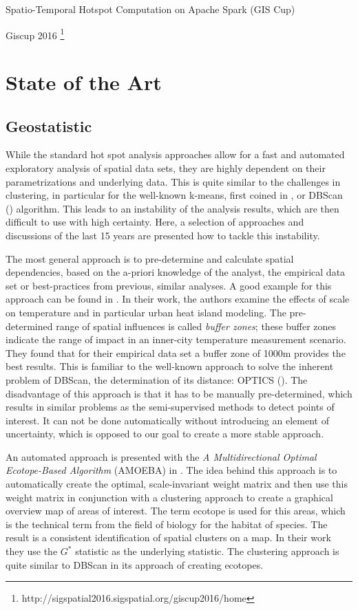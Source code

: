 \documentclass[a4paper,UKenglish]{lipics-v2016}
\begin{document}
\cite{mehta2016spatio}   Spatio-Temporal Hotspot Computation on Apache Spark (GIS Cup) 

Giscup 2016 \footnote{http://sigspatial2016.sigspatial.org/giscup2016/home}

\section{State of the Art}
\subsection{Geostatistic}
While the standard hot spot analysis approaches allow for a fast and automated exploratory analysis of spatial data sets, they are highly dependent on their parametrizations and underlying data. This is quite similar to the challenges in clustering, in particular for the well-known k-means, first coined in \cite{macqueen1967some}, or DBScan (\cite{ester1996density}) algorithm. This leads to an instability of the analysis results, which are then difficult to use with high certainty. Here, a selection of approaches and discussions of the last 15 years are presented how to tackle this instability.

The most general approach is to pre-determine and calculate spatial dependencies, based on the a-priori knowledge of the analyst, the empirical data set or best-practices from previous, similar analyses. A good example for this approach can be found in \cite{suomi2012effects}. In their work, the authors examine the effects of scale on temperature and in particular urban heat island modeling. The pre-determined range of spatial influences is called \emph{buffer zones}; these buffer zones indicate the range of impact in an inner-city temperature measurement scenario. They found that for their empirical data set a buffer zone of 1000m provides the best results. This is familiar to the well-known approach to solve the inherent problem of DBScan, the determination of its distance: OPTICS (\cite{ankerst1999optics}). The disadvantage of this approach is that it has to be manually pre-determined, which results in similar problems as the semi-supervised methods to detect points of interest. It can not be done automatically without introducing an element of uncertainty, which is opposed to our goal to create a more stable approach.

An automated approach is presented with the \emph{A Multidirectional Optimal Ecotope-Based Algorithm} (AMOEBA) in \cite{aldstadt2006using}. The idea behind this approach is to automatically create the optimal, scale-invariant weight matrix and then use this weight matrix in conjunction with a clustering approach to create a graphical overview map of areas of interest. The term ecotope is used for this areas, which is the technical term from the field of biology for the habitat of species. The result is a consistent identification of spatial clusters on a map. In their work they use the $G^*$ statistic as the underlying statistic. The clustering approach is quite similar to DBScan in its approach of creating ecotopes. 
\end{document}
